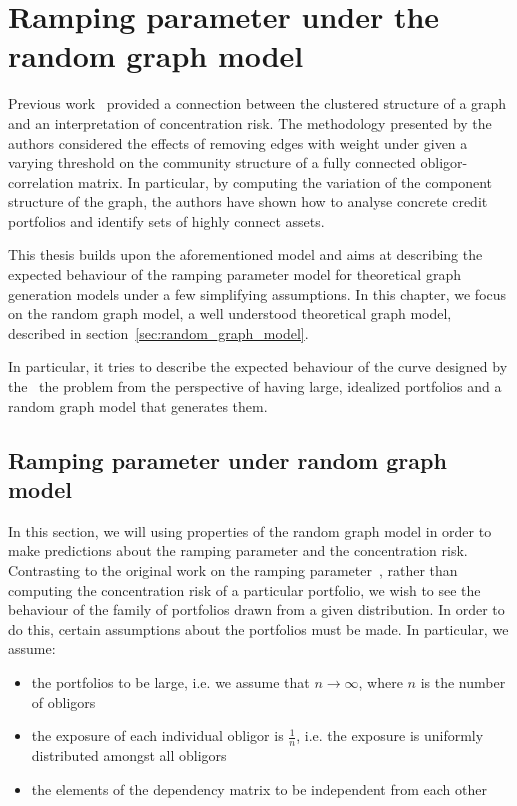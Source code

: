 \chapter{Ramping parameter under the random graph model} %
\label{cha:ramping_parameter_under_the_random_graph_model}

Previous work~\cite{Sindel:2009vd} provided a connection between the clustered structure of a graph and an interpretation of concentration risk.
The methodology presented by the authors considered the effects of removing edges with weight under given a varying threshold on the community structure of a fully connected obligor-correlation matrix.
In particular, by computing the variation of the component structure of the graph, the authors have shown how to analyse concrete credit portfolios and identify sets of highly connect assets.


This thesis builds upon the aforementioned model and aims at describing the expected behaviour of the ramping parameter model for theoretical graph generation models under a few simplifying assumptions.
In this chapter, we focus on the random graph model, a well understood theoretical graph model, described in section~\vref{sec:random_graph_model}.

In particular, it tries to describe the expected behaviour of the curve designed by the~\cite{Sindel:2009vd} the problem from the perspective of having
large, idealized portfolios 
and a random graph model that generates them.




\section{Ramping parameter under random graph model} %
\label{sec:ramping_parameter_under_random_graph_model}


In this section, we will using properties of the random graph model in order to make predictions about the ramping parameter and the concentration risk.
Contrasting to the original work on the ramping parameter~\cite{Sindel:2009vd}, rather than computing the concentration risk of a particular portfolio, we wish to see the behaviour of the family of portfolios drawn from a given distribution.
In order to do this, certain assumptions about the portfolios must be made.
In particular, we assume:
\begin{itemize}
	\item the portfolios to be large, i.e. we assume that $n \rightarrow \infty$, where $n$ is the number of obligors
	\item the exposure of each individual obligor is $\frac{1}{n}$, i.e. the exposure is uniformly distributed amongst all obligors
	\item the elements of the dependency matrix to be independent from each other
\end{itemize}

